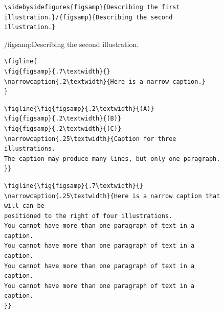 \documentclass{JASA-EL}
\begin{document}
\begin{figure}
\baselineskip=12pt
\begin{verbatim}
\sidebysidefigures{figsamp}{Describing the first
illustration.}/{figsamp}{Describing the second illustration.}
\end{verbatim}

/{figsamp}{Describing the second illustration.}
\end{figure}


\begin{figure}
\baselineskip=12pt
\begin{verbatim}
\figline{
\fig{figsamp}{.7\textwidth}{}
\narrowcaption{.2\textwidth}{Here is a narrow caption.}
}
\end{verbatim}
\end{figure}


\begin{figure}
\baselineskip=12pt
\begin{verbatim}
\figline{\fig{figsamp}{.2\textwidth}{(A)}
\fig{figsamp}{.2\textwidth}{(B)}
\fig{figsamp}{.2\textwidth}{(C)}
\narrowcaption{.25\textwidth}{Caption for three illustrations. 
The caption may produce many lines, but only one paragraph.
}}
\end{verbatim}
\end{figure}



\begin{figure}
\baselineskip=12pt
\begin{verbatim}
\figline{\fig{figsamp}{.7\textwidth}{}
\narrowcaption{.25\textwidth}{Here is a narrow caption that will can be
positioned to the right of four illustrations.
You cannot have more than one paragraph of text in a caption.
You cannot have more than one paragraph of text in a caption.
You cannot have more than one paragraph of text in a caption.
You cannot have more than one paragraph of text in a caption.
}}
\end{verbatim}
\end{figure}
\clearpage
\end{document}
